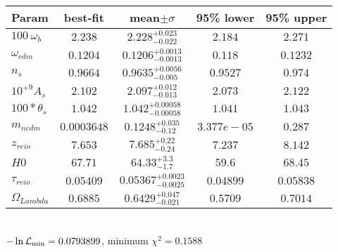 \begin{tabular}{|l|c|c|c|c|} 
 \hline 
Param & best-fit & mean$\pm\sigma$ & 95\% lower & 95\% upper \\ \hline 
$100~\omega{}_{b }$ &$2.238$ & $2.228_{-0.022}^{+0.023}$ & $2.184$ & $2.271$ \\ 
$\omega{}_{cdm }$ &$0.1204$ & $0.1206_{-0.0013}^{+0.0013}$ & $0.118$ & $0.1232$ \\ 
$n_{s }$ &$0.9664$ & $0.9635_{-0.005}^{+0.0056}$ & $0.9527$ & $0.974$ \\ 
$10^{+9}A_{s }$ &$2.102$ & $2.097_{-0.013}^{+0.012}$ & $2.073$ & $2.122$ \\ 
$100*\theta{}_{s }$ &$1.042$ & $1.042_{-0.00058}^{+0.00058}$ & $1.041$ & $1.043$ \\ 
$m_{ncdm }$ &$0.0003648$ & $0.1248_{-0.12}^{+0.035}$ & $3.377e-05$ & $0.287$ \\ 
$z_{reio }$ &$7.653$ & $7.685_{-0.24}^{+0.22}$ & $7.237$ & $8.142$ \\ 
$H0$ &$67.71$ & $64.33_{-1.7}^{+3.3}$ & $59.6$ & $68.45$ \\ 
$\tau{}_{reio }$ &$0.05409$ & $0.05367_{-0.0025}^{+0.0023}$ & $0.04899$ & $0.05838$ \\ 
$\Omega{}_{Lambda }$ &$0.6885$ & $0.6429_{-0.021}^{+0.047}$ & $0.5709$ & $0.7014$ \\ 
\hline 
 \end{tabular} \\ 
$-\ln{\cal L}_\mathrm{min} =0.0793899$, minimum $\chi^2=0.1588$ \\ 
